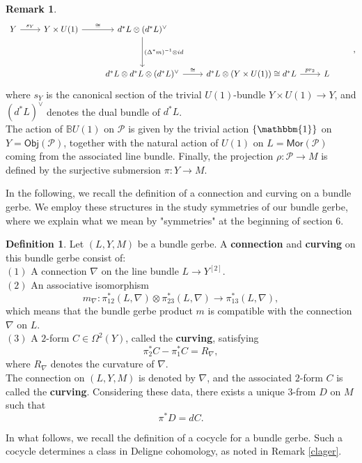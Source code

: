 \documentclass{article}
\theoremstyle{plain}
\theoremstyle{definition}
\newtheorem{defn}[thm]{Definition}
\newtheorem{rem}[thm]{Remark}
\begin{document}
\begin{rem}
\[\begin{tikzcd}
Y \arrow[r,"s_Y"] & Y \times U(1) \arrow[r,"\cong"] & d^*L \otimes (d^*L)^\vee \arrow[dd,"{(\Delta^*m)^{-1} \otimes id}"] & & \\
& & & & & \\
& & d^*L \otimes d^*L \otimes (d^*L)^\vee \arrow[r,"\cong"] & d^*L \otimes (Y \times U(1)) \cong d^*L \arrow[r,"pr_2"] & L
\end{tikzcd},
\]
where $s_Y$ is the canonical section of the trivial $U(1)$-bundle $Y \times U(1) \longrightarrow Y$, and $(d^*L)^\vee$ denotes the dual bundle of $d^*L$. \\
The action of $\mathbb{B}U(1)$ on $\mathcal{P}$ is given by the trivial action $\left\{\mathbbm{1}\right\}$ on $Y = \mathsf{Obj}(\mathcal{P})$, together with the natural action of $U(1)$ on $L = \mathsf{Mor}(\mathcal{P})$ coming from the associated line bundle. Finally, the projection $\rho:\mathcal{P} \longrightarrow M$ is defined by the surjective submersion $\pi:Y \longrightarrow M$.
\end{rem}
In the following, we recall the definition of a connection and curving on a bundle gerbe. We employ these structures in the study symmetries of our bundle gerbe, where we explain what we mean by "symmetries" at the beginning of section $6$.
\begin{defn}\cite{MR1669206,MR2681698}\cite[Definition 1 on page 34]{MR2318847}\label{gerbeconn}
Let $(L,Y,M)$ be a bundle gerbe. A \textbf{connection} and \textbf{curving} on this bundle gerbe consist of: \\
$(1)$ A connection $\nabla$ on the line bundle $L \longrightarrow Y^{[2]}$. \\
$(2)$ An associative isomorphism
$$m_{\nabla}:\pi^*_{12}(L,\nabla) \otimes \pi^*_{23}(L,\nabla) \longrightarrow \pi^*_{13}(L,\nabla),$$
which means that the bundle gerbe product $m$ is compatible with the connection $\nabla$ on $L$. \\
$(3)$ A $2$-form $C \in \Omega^2(Y)$, called the \textbf{curving}, satisfying
$$\pi^*_2 C - \pi^*_1 C = R_\nabla,$$
where $R_\nabla$ denotes the curvature of $\nabla$. \\
The connection on $(L,Y,M)$ is denoted by $\nabla$, and the associated $2$-form $C$ is called the \textbf{curving}.
Considering these data, there exists a unique $3$-from $D$ on $M$ such that $$\pi^*D = dC.$$
\end{defn}
In what follows, we recall the definition of a cocycle for a bundle gerbe. Such a cocycle determines a class in Deligne cohomology, as noted in Remark \ref{clager}.
\end{document}
